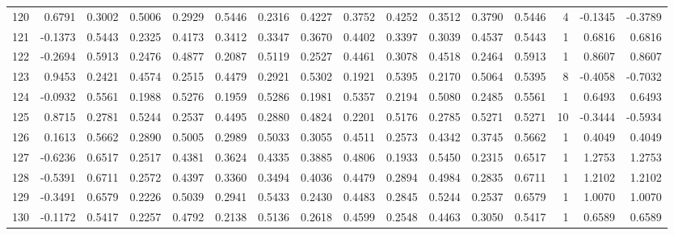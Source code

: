 \begin{tabular}{lrrrrrrrrrrrrrrr}
120 &      0.6791 &  0.3002 &  0.5006 &  0.2929 &  0.5446 &  0.2316 &  0.4227 &  0.3752 &  0.4252 &  0.3512 &   0.3790 &     0.5446 &      4 &                   -0.1345 &                    -0.3789 \\
121 &     -0.1373 &  0.5443 &  0.2325 &  0.4173 &  0.3412 &  0.3347 &  0.3670 &  0.4402 &  0.3397 &  0.3039 &   0.4537 &     0.5443 &      1 &                    0.6816 &                     0.6816 \\
122 &     -0.2694 &  0.5913 &  0.2476 &  0.4877 &  0.2087 &  0.5119 &  0.2527 &  0.4461 &  0.3078 &  0.4518 &   0.2464 &     0.5913 &      1 &                    0.8607 &                     0.8607 \\
123 &      0.9453 &  0.2421 &  0.4574 &  0.2515 &  0.4479 &  0.2921 &  0.5302 &  0.1921 &  0.5395 &  0.2170 &   0.5064 &     0.5395 &      8 &                   -0.4058 &                    -0.7032 \\
124 &     -0.0932 &  0.5561 &  0.1988 &  0.5276 &  0.1959 &  0.5286 &  0.1981 &  0.5357 &  0.2194 &  0.5080 &   0.2485 &     0.5561 &      1 &                    0.6493 &                     0.6493 \\
125 &      0.8715 &  0.2781 &  0.5244 &  0.2537 &  0.4495 &  0.2880 &  0.4824 &  0.2201 &  0.5176 &  0.2785 &   0.5271 &     0.5271 &     10 &                   -0.3444 &                    -0.5934 \\
126 &      0.1613 &  0.5662 &  0.2890 &  0.5005 &  0.2989 &  0.5033 &  0.3055 &  0.4511 &  0.2573 &  0.4342 &   0.3745 &     0.5662 &      1 &                    0.4049 &                     0.4049 \\
127 &     -0.6236 &  0.6517 &  0.2517 &  0.4381 &  0.3624 &  0.4335 &  0.3885 &  0.4806 &  0.1933 &  0.5450 &   0.2315 &     0.6517 &      1 &                    1.2753 &                     1.2753 \\
128 &     -0.5391 &  0.6711 &  0.2572 &  0.4397 &  0.3360 &  0.3494 &  0.4036 &  0.4479 &  0.2894 &  0.4984 &   0.2835 &     0.6711 &      1 &                    1.2102 &                     1.2102 \\
129 &     -0.3491 &  0.6579 &  0.2226 &  0.5039 &  0.2941 &  0.5433 &  0.2430 &  0.4483 &  0.2845 &  0.5244 &   0.2537 &     0.6579 &      1 &                    1.0070 &                     1.0070 \\
130 &     -0.1172 &  0.5417 &  0.2257 &  0.4792 &  0.2138 &  0.5136 &  0.2618 &  0.4599 &  0.2548 &  0.4463 &   0.3050 &     0.5417 &      1 &                    0.6589 &                     0.6589 \\

\end{tabular}
